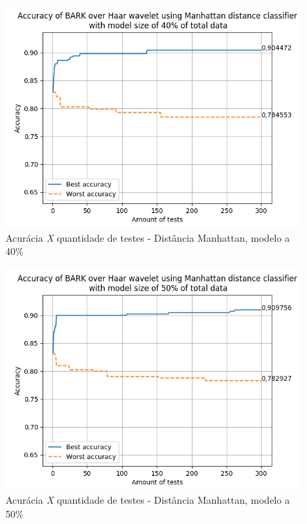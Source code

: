 \begin{myenv}{1.5}
			\newpage
			\begin{figure}[h]
				\centering
				\includegraphics{images/results/confusionMatrices/classifier_Manhattan_40.png}
				\caption{Acurácia \textit{X} quantidade de testes - Distância Manhattan, modelo a 40\%}
				\label{fig:classifiermanhattan40}
			\end{figure}
			
			
			\newpage
			\begin{figure}[h]
				\centering
				\includegraphics{images/results/confusionMatrices/classifier_Manhattan_50.png}
				\caption{Acurácia \textit{X} quantidade de testes - Distância Manhattan, modelo a 50\%}
				\label{fig:classifiermanhattan50}
			\end{figure}
			


\end{myenv}
